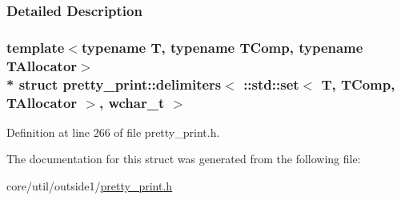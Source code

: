 \subsubsection{Detailed Description}
\subsubsection*{template$<$typename T, typename T\+Comp, typename T\+Allocator$>$\\*
struct pretty\+\_\+print\+::delimiters$<$ \+::std\+::set$<$ T, T\+Comp, T\+Allocator $>$, wchar\+\_\+t $>$}



Definition at line 266 of file pretty\+\_\+print.\+h.



The documentation for this struct was generated from the following file\+:\begin{DoxyCompactItemize}
\item 
core/util/outside1/\hyperlink{pretty__print_8h}{pretty\+\_\+print.\+h}\end{DoxyCompactItemize}
